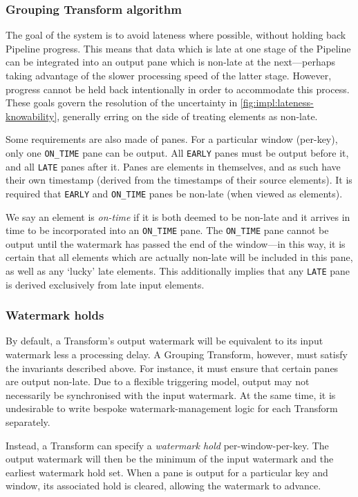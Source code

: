 \subsubsection{Grouping Transform algorithm}

The goal of the system is to avoid lateness where possible, without holding back Pipeline progress.
This means that data which is late at one stage of the Pipeline can be integrated into an output pane which is non-late at the next---perhaps taking advantage of the slower processing speed of the latter stage.
However, progress cannot be held back intentionally in order to accommodate this process.
These goals govern the resolution of the uncertainty in \cref{fig:impl:lateness-knowability}, generally erring on the side of treating elements as non-late.

Some requirements are also made of panes.
For a particular window (per-key), only one \verb|ON_TIME| pane can be output.
All \verb|EARLY| panes must be output before it, and all \verb|LATE| panes after it.
Panes are elements in themselves, and as such have their own timestamp (derived from the timestamps of their source elements).
It is required that \verb|EARLY| and \verb|ON_TIME| panes be non-late (when viewed as elements).

We say an element is \emph{on-time} if it is both deemed to be non-late and it arrives in time to be incorporated into an \verb|ON_TIME| pane.
The \verb|ON_TIME| pane cannot be output until the watermark has passed the end of the window---in this way, it is certain that all elements which are actually non-late will be included in this pane, as well as any `lucky' late elements.
This additionally implies that any \verb|LATE| pane is derived exclusively from late input elements.

\subsubsection{Watermark holds}

By default, a Transform's output watermark will be equivalent to its input watermark less a processing delay.
A Grouping Transform, however, must satisfy the invariants described above.
For instance, it must ensure that certain panes are output non-late.
Due to a flexible triggering model, output may not necessarily be synchronised with the input watermark.
At the same time, it is undesirable to write bespoke watermark-management logic for each Transform separately.

Instead, a Transform can specify a \emph{watermark hold} per-window-per-key.
The output watermark will then be the minimum of the input watermark and the earliest watermark hold set.
When a pane is output for a particular key and window, its associated hold is cleared, allowing the watermark to advance.

